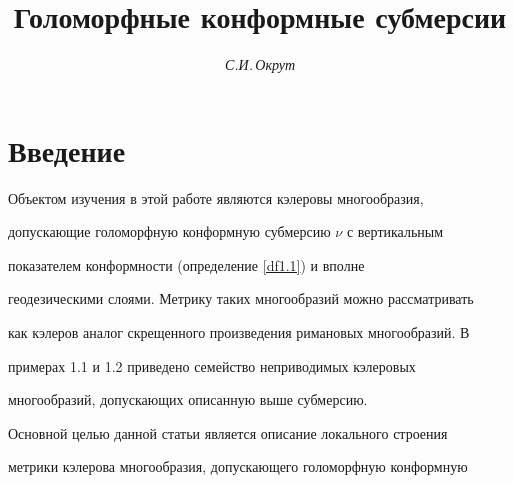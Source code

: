 






\author{\it С.И.\,Окрут}




\title{Голоморфные конформные субмерсии}





\date{}




\pagestyle{plain} %







\maketitle


\label{begin}





\section*{Введение}





Объектом изучения в этой работе являются кэлеровы многообразия,


допускающие голоморфную конформную субмерсию $\nu$ с вертикальным


показателем конформности (определение \ref{df1.1}) и вполне


геодезическими слоями. Метрику таких многообразий можно рассматривать


как кэлеров аналог скрещенного произведения римановых многообразий. В


примерах 1.1 и 1.2 приведено семейство неприводимых кэлеровых


многообразий, допускающих описанную выше субмерсию.





Основной целью данной статьи является описание локального строения


метрики кэлерова многообразия, допускающего голоморфную конформную



